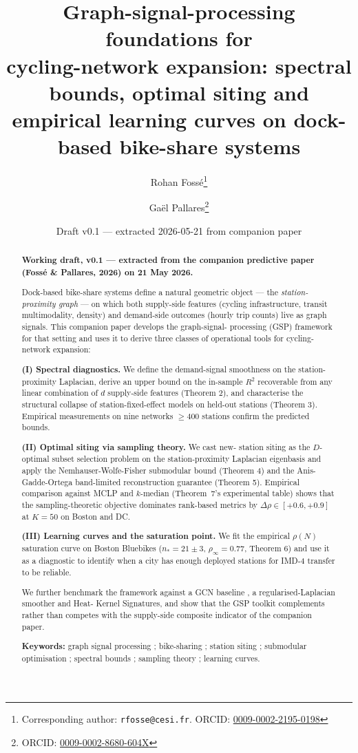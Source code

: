 \documentclass[11pt,a4paper]{article}
\title{\Large\bfseries Graph-signal-processing foundations for\\
\large cycling-network expansion: spectral bounds, optimal siting and\\
empirical learning curves on dock-based bike-share systems}
\author[1]{Rohan Fossé\thanks{Corresponding author: \texttt{rfosse@cesi.fr}. ORCID: \href{https://orcid.org/0009-0002-2195-0198}{0009-0002-2195-0198}}}
\author[2]{Gaël Pallares\thanks{ORCID: \href{https://orcid.org/0009-0002-8680-604X}{0009-0002-8680-604X}}}
\affil[1]{CESI Engineering School, Montpellier, France}
\affil[2]{CESI LINEACT (EA 7527), Montpellier, France}
\date{Draft v0.1 — extracted 2026-05-21 from companion paper}
\begin{document}
\maketitle

\begin{abstract}
\noindent
\textbf{Working draft, v0.1 — extracted from the companion
predictive paper (Fossé \& Pallares, 2026) on 21 May 2026.}

Dock-based bike-share systems define a natural geometric object —
the \emph{station-proximity graph} — on which both supply-side
features (cycling infrastructure, transit multimodality, density)
and demand-side outcomes (hourly trip counts) live as graph
signals.  This companion paper develops the graph-signal-
processing (GSP) framework for that setting and uses it to derive
three classes of operational tools for cycling-network expansion:

\textbf{(I) Spectral diagnostics.}  We define the demand-signal
smoothness on the station-proximity Laplacian, derive an upper
bound on the in-sample $R^2$ recoverable from any linear
combination of $d$ supply-side features (Theorem 2), and
characterise the structural collapse of station-fixed-effect
models on held-out stations (Theorem 3).  Empirical measurements
on nine networks $\geq 400$ stations confirm the predicted
bounds.

\textbf{(II) Optimal siting via sampling theory.}  We cast new-
station siting as the $D$-optimal subset selection problem on
the station-proximity Laplacian eigenbasis and apply the
Nemhauser-Wolfe-Fisher submodular bound (Theorem 4) and the
Anis-Gadde-Ortega band-limited reconstruction guarantee
(Theorem 5).  Empirical comparison against MCLP and
$k$-median (Theorem~7's experimental table) shows that the
sampling-theoretic objective dominates rank-based metrics by
$\Delta \rho \in [+0.6, +0.9]$ at $K = 50$ on Boston and DC.

\textbf{(III) Learning curves and the saturation point.}  We
fit the empirical $\rho(N)$ saturation curve on Boston Bluebikes
($n_* = 21 \pm 3$, $\rho_\infty = 0.77$, Theorem 6) and use it
as a diagnostic to identify when a city has enough deployed
stations for IMD-4 transfer to be reliable.

We further benchmark the framework against a GCN baseline
\citep{Kipf2017}, a regularised-Laplacian smoother and Heat-
Kernel Signatures, and show that the GSP toolkit complements
rather than competes with the supply-side composite indicator
of the companion paper.

\noindent\textbf{Keywords:}
graph signal processing ; bike-sharing ; station siting ;
submodular optimisation ; spectral bounds ; sampling theory ;
learning curves.
\end{abstract}
\end{document}
